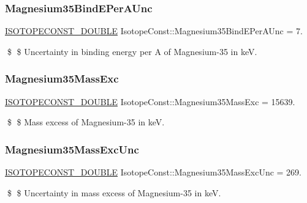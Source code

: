 \subsubsection{\texorpdfstring{Magnesium35\+Bind\+E\+Per\+A\+Unc}{Magnesium35BindEPerAUnc}}
{\footnotesize\ttfamily \mbox{\hyperlink{group___isotope_const-_macros_ga8f45a7272ce02c0b4c65c44636ed719a}{I\+S\+O\+T\+O\+P\+E\+C\+O\+N\+S\+T\+\_\+\+D\+O\+U\+B\+LE}} Isotope\+Const\+::\+Magnesium35\+Bind\+E\+Per\+A\+Unc = 7.}

\$ \$ Uncertainty in binding energy per A of Magnesium-\/35 in keV. \mbox{\label{group___isotope_const-_magnesium-_mg35_ga4f2c581400ebc41f06a67e216a019678}} 
\subsubsection{\texorpdfstring{Magnesium35\+Mass\+Exc}{Magnesium35MassExc}}
{\footnotesize\ttfamily \mbox{\hyperlink{group___isotope_const-_macros_ga8f45a7272ce02c0b4c65c44636ed719a}{I\+S\+O\+T\+O\+P\+E\+C\+O\+N\+S\+T\+\_\+\+D\+O\+U\+B\+LE}} Isotope\+Const\+::\+Magnesium35\+Mass\+Exc = 15639.}

\$ \$ Mass excess of Magnesium-\/35 in keV. \mbox{\label{group___isotope_const-_magnesium-_mg35_ga07d0839252ad10127bf31a4f9f360127}} 
\subsubsection{\texorpdfstring{Magnesium35\+Mass\+Exc\+Unc}{Magnesium35MassExcUnc}}
{\footnotesize\ttfamily \mbox{\hyperlink{group___isotope_const-_macros_ga8f45a7272ce02c0b4c65c44636ed719a}{I\+S\+O\+T\+O\+P\+E\+C\+O\+N\+S\+T\+\_\+\+D\+O\+U\+B\+LE}} Isotope\+Const\+::\+Magnesium35\+Mass\+Exc\+Unc = 269.}

\$ \$ Uncertainty in mass excess of Magnesium-\/35 in keV. \mbox{\label{group___isotope_const-_magnesium-_mg35_ga39d60de0b20535235a522c814bb25247}} 
